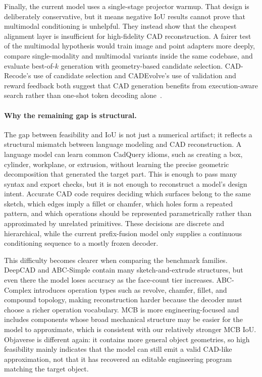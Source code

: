 \documentclass{article}
\begin{document}
Finally, the current model uses a single-stage projector warmup. That design is deliberately conservative, but it means negative IoU results cannot prove that multimodal conditioning is unhelpful. They instead show that the cheapest alignment layer is insufficient for high-fidelity CAD reconstruction. A fairer test of the multimodal hypothesis would train image and point adapters more deeply, compare single-modality and multimodal variants inside the same codebase, and evaluate best-of-$k$ generation with geometry-based candidate selection. CAD-Recode's use of candidate selection and CADEvolve's use of validation and reward feedback both suggest that CAD generation benefits from execution-aware search rather than one-shot token decoding alone~\cite{cadrecode,elistratov2026cadevolve}.

\paragraph{Why the remaining gap is structural.}
The gap between feasibility and IoU is not just a numerical artifact; it reflects a structural mismatch between language modeling and CAD reconstruction. A language model can learn common CadQuery idioms, such as creating a box, cylinder, workplane, or extrusion, without learning the precise geometric decomposition that generated the target part. This is enough to pass many syntax and export checks, but it is not enough to reconstruct a model's design intent. Accurate CAD code requires deciding which surfaces belong to the same sketch, which edges imply a fillet or chamfer, which holes form a repeated pattern, and which operations should be represented parametrically rather than approximated by unrelated primitives. These decisions are discrete and hierarchical, while the current prefix-fusion model only supplies a continuous conditioning sequence to a mostly frozen decoder.

This difficulty becomes clearer when comparing the benchmark families. DeepCAD and ABC-Simple contain many sketch-and-extrude structures, but even there the model loses accuracy as the face-count tier increases. ABC-Complex introduces operation types such as revolve, chamfer, fillet, and compound topology, making reconstruction harder because the decoder must choose a richer operation vocabulary. MCB is more engineering-focused and includes components whose broad mechanical structure may be easier for the model to approximate, which is consistent with our relatively stronger MCB IoU. Objaverse is different again: it contains more general object geometries, so high feasibility mainly indicates that the model can still emit a valid CAD-like approximation, not that it has recovered an editable engineering program matching the target object.
\end{document}
